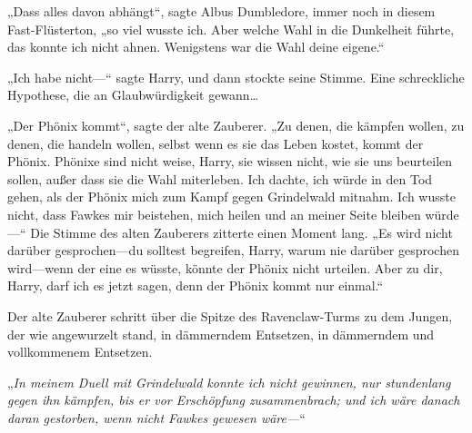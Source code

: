 „Dass alles davon abhängt“, sagte Albus Dumbledore, immer noch in diesem Fast-Flüsterton, „so viel wusste ich. Aber welche Wahl in die Dunkelheit führte, das konnte ich nicht ahnen. Wenigstens war die Wahl deine eigene.“

„Ich habe nicht—“ sagte Harry, und dann stockte seine Stimme.
Eine schreckliche Hypothese, die an Glaubwürdigkeit gewann…

„Der Phönix kommt“, sagte der alte Zauberer. „Zu denen, die kämpfen wollen, zu denen, die handeln wollen, selbst wenn es sie das Leben kostet, kommt der Phönix. Phönixe sind nicht weise, Harry, sie wissen nicht, wie sie uns beurteilen sollen, außer dass sie die Wahl miterleben. Ich dachte, ich würde in den Tod gehen, als der Phönix mich zum Kampf gegen Grindelwald mitnahm. Ich wusste nicht, dass Fawkes mir beistehen, mich heilen und an meiner Seite bleiben würde—“
Die Stimme des alten Zauberers zitterte einen Moment lang.
„Es wird nicht darüber gesprochen—du solltest begreifen, Harry, warum nie darüber gesprochen wird—wenn der eine es wüsste, könnte der Phönix nicht urteilen. Aber zu dir, Harry, darf ich es jetzt sagen, denn der Phönix kommt nur einmal.“

Der alte Zauberer schritt über die Spitze des Ravenclaw-Turms zu dem Jungen, der wie angewurzelt stand, in dämmerndem Entsetzen, in dämmerndem und vollkommenem Entsetzen.

„\emph{In meinem Duell mit Grindelwald konnte ich nicht gewinnen, nur stundenlang gegen ihn kämpfen, bis er vor Erschöpfung zusammenbrach; und ich wäre danach daran gestorben, wenn nicht Fawkes gewesen wäre—}“

